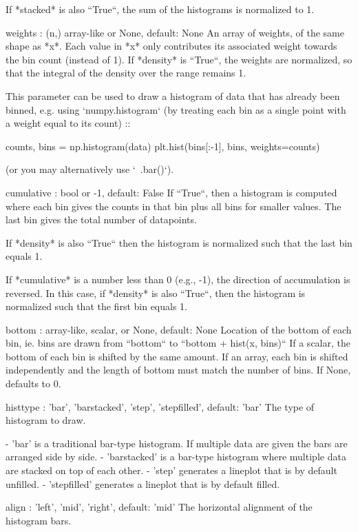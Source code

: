 \begin{DoxyVerb}
\begin{DoxyVerb}
    If *stacked* is also ``True``, the sum of the histograms is
    normalized to 1.

weights : (n,) array-like or None, default: None
    An array of weights, of the same shape as *x*.  Each value in
    *x* only contributes its associated weight towards the bin count
    (instead of 1).  If *density* is ``True``, the weights are
    normalized, so that the integral of the density over the range
    remains 1.

    This parameter can be used to draw a histogram of data that has
    already been binned, e.g. using `numpy.histogram` (by treating each
    bin as a single point with a weight equal to its count) ::

counts, bins = np.histogram(data)
plt.hist(bins[:-1], bins, weights=counts)

    (or you may alternatively use `~.bar()`).

cumulative : bool or -1, default: False
    If ``True``, then a histogram is computed where each bin gives the
    counts in that bin plus all bins for smaller values. The last bin
    gives the total number of datapoints.

    If *density* is also ``True`` then the histogram is normalized such
    that the last bin equals 1.

    If *cumulative* is a number less than 0 (e.g., -1), the direction
    of accumulation is reversed.  In this case, if *density* is also
    ``True``, then the histogram is normalized such that the first bin
    equals 1.

bottom : array-like, scalar, or None, default: None
    Location of the bottom of each bin, ie. bins are drawn from
    ``bottom`` to ``bottom + hist(x, bins)`` If a scalar, the bottom
    of each bin is shifted by the same amount. If an array, each bin
    is shifted independently and the length of bottom must match the
    number of bins. If None, defaults to 0.

histtype : {'bar', 'barstacked', 'step', 'stepfilled'}, default: 'bar'
    The type of histogram to draw.

    - 'bar' is a traditional bar-type histogram.  If multiple data
      are given the bars are arranged side by side.
    - 'barstacked' is a bar-type histogram where multiple
      data are stacked on top of each other.
    - 'step' generates a lineplot that is by default unfilled.
    - 'stepfilled' generates a lineplot that is by default filled.

align : {'left', 'mid', 'right'}, default: 'mid'
    The horizontal alignment of the histogram bars.


\end{DoxyVerb}
\end{DoxyVerb}
